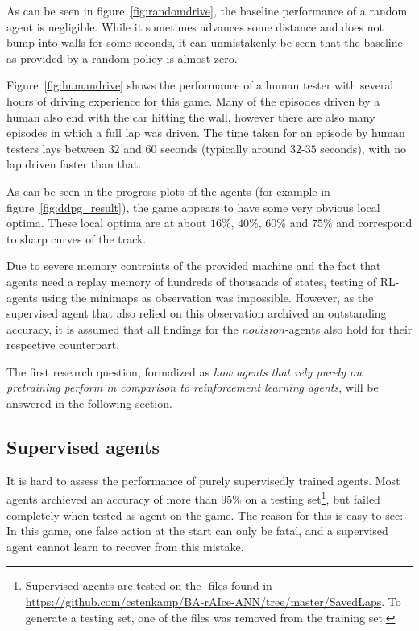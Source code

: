 As can be seen in figure~\ref{fig:randomdrive}, the baseline performance of a random agent is negligible. While it sometimes advances some distance and does not bump into walls for some seconds, it can unmistakenly be seen that the baseline as provided by a random policy is almost zero.

Figure~\ref{fig:humandrive} shows the performance of a human tester with several hours of driving experience for this game. Many of the episodes driven by a human also end with the car hitting the wall, however there are also many episodes in which a full lap was driven. The time taken for an episode by human testers lays between $32$ and $60$ seconds (typically around $32$-$35$ seconds), with no lap driven faster than that.

As can be seen in the progress-plots of the agents (for example in figure~\ref{fig:ddpg_result}), the game appears to have some very obvious local optima. These local optima are at about $16\%$, $40\%$, $60\%$ and $75\%$ and correspond to sharp curves of the track.

Due to severe memory contraints of the provided machine and the fact that agents need a replay memory of hundreds of thousands of states, testing of RL-agents using the minimaps as observation was impossible. However, as the supervised agent that also relied on this observation archived an outstanding accuracy, it is assumed that all findings for the $novision$-agents also hold for their respective counterpart.

The first research question, formalized as \textit{how agents that rely purely on pretraining perform in comparison to reinforcement learning agents}, will be answered in the following section.

\subsection{Supervised agents}

It is hard to assess the performance of purely supervisedly trained agents. Most agents archieved an accuracy of more than $95\%$ on a testing set\footnote{Supervised agents are tested on the -files found in \url{https://github.com/cstenkamp/BA-rAIce-ANN/tree/master/SavedLaps}. To generate a testing set, one of the files was removed from the training set.}, but failed completely when tested as agent on the game. The reason for this is easy to see: In this game, one false action at the start can only be fatal, and a supervised agent cannot learn to recover from this mistake.

